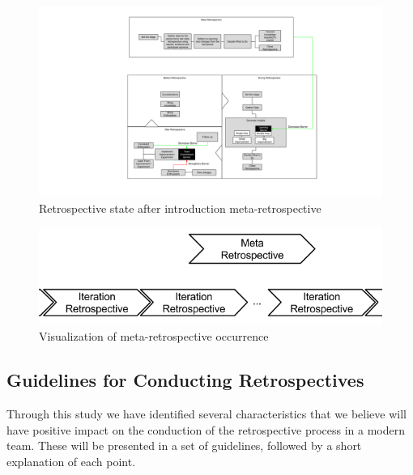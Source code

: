 \begin{figure}
	\centering
	\includegraphics[width=\textwidth, keepaspectratio]{figures/meta-retro.png}
	\caption{Retrospective state after introduction meta-retrospective}
	\label{figure:retro-meta-state}
\end{figure}

\begin{figure}[!h]
	\centering
	\includegraphics[width=\textwidth, keepaspectratio]{figures/meta-retro-occurence.png}
	\caption{Visualization of meta-retrospective occurrence}
	\label{figure:retro-meta-occurence}
\end{figure}

\subsection{Guidelines for Conducting Retrospectives}

Through this study we have identified several characteristics that we believe will have positive impact on the conduction of the retrospective process in a modern team. These will be presented in a set of guidelines, followed by a short explanation of each point.

